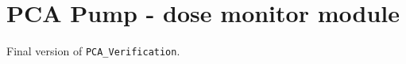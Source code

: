 
\cleardoublepage

\chapter{PCA Pump - dose monitor module}
\label{Appendix:pcapump:dose_monitor_module}

Final version of \lstinline{PCA_Verification}.

